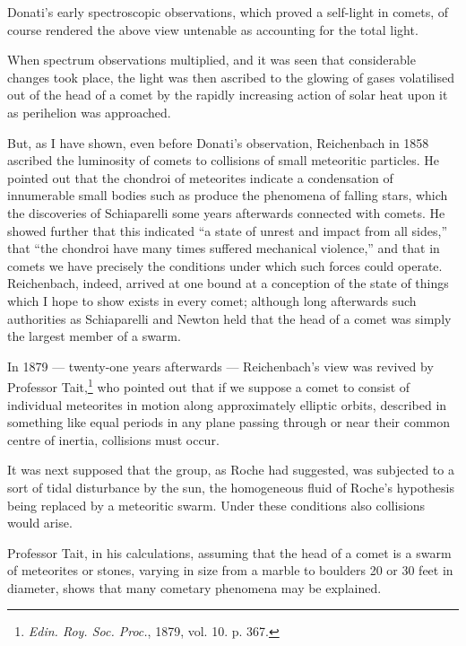 \documentclass[a4paper, 12pt, oneside, polutonikogreek, english]{article}
\begin{document}
Donati's early spectroscopic observations, which proved a self-light in comets, of course rendered the above view untenable as accounting for the total light.

When spectrum observations multiplied, and it was seen that considerable changes took place, the light was then ascribed to the glowing of gases volatilised out of the head of a comet by the rapidly increasing action of solar heat upon it as perihelion was approached.

But, as I have shown, even before Donati's observation, Reichenbach in 1858 ascribed the luminosity of comets to collisions of small meteoritic particles. He pointed out that the chondroi of meteorites indicate a condensation of innumerable small bodies such as produce the phenomena of falling stars, which the discoveries of Schiaparelli some years afterwards connected with comets. He showed further that this indicated ``a state of unrest and impact from all sides,'' that ``the chondroi have many times suffered mechanical violence,'' and that in comets we have precisely the conditions under which such forces could operate. Reichenbach, indeed, arrived at one bound at a conception of the state of things which I hope to show exists in every comet; although long afterwards such authorities as Schiaparelli and Newton held that the head of a comet was simply the largest member of a swarm.

In 1879 --- twenty-one years afterwards --- Reichenbach's view was revived by Professor Tait,\footnote{\emph{Edin. Roy. Soc. Proc.}, 1879, vol. 10. p. 367.} who pointed out that if we suppose a comet to consist of individual meteorites in motion along approximately elliptic orbits, described in something like equal periods in any plane passing through or near their common centre of inertia, collisions must occur.

It was next supposed that the group, as Roche had suggested, was subjected to a sort of tidal disturbance by the sun, the homogeneous fluid of Roche's hypothesis being replaced by a meteoritic swarm. Under these conditions also collisions would arise.

Professor Tait, in his calculations, assuming that the head of a comet is a swarm of meteorites or stones, varying in size from a marble to boulders 20 or 30 feet in diameter, shows that many cometary phenomena may be explained.
\end{document}
